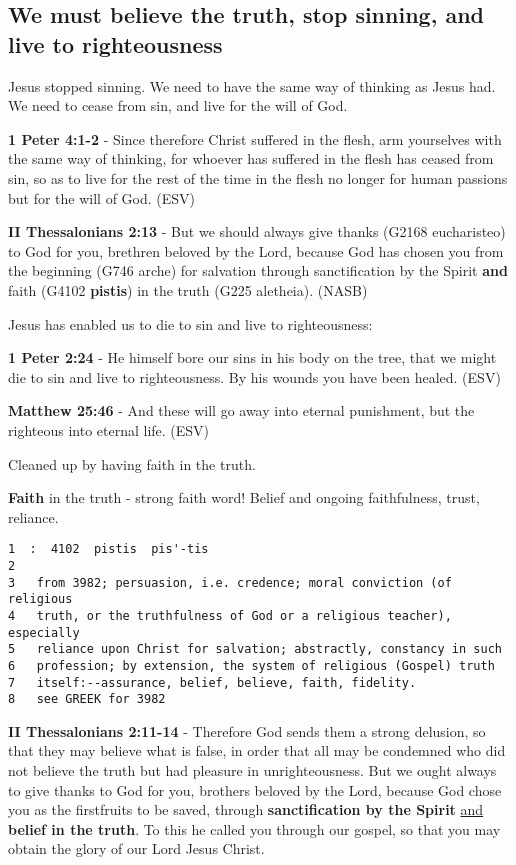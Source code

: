 \documentclass[11pt]{article}
\begin{document}
\subsection{We must believe the truth, stop sinning, and live to righteousness}
\label{sec:orgf050afa}
Jesus stopped sinning. We need to have the same way of thinking as Jesus had.
We need to cease from sin, and live for the will of God.

\textbf{1 Peter 4:1-2} - Since therefore Christ suffered in the flesh, arm yourselves with the same way of thinking, for whoever has suffered in the flesh has ceased from sin, so as to live for the rest of the time in the flesh no longer for human passions but for the will of God. (ESV)

\textbf{II Thessalonians 2:13} - But we should always give thanks (G2168 eucharisteo) to God for you, brethren beloved by the Lord, because God has chosen you from the beginning (G746 arche) for salvation through sanctification by the Spirit \textbf{and} faith (G4102 \textbf{pistis}) in the truth (G225 aletheia). (NASB)

Jesus has enabled us to die to sin and live to righteousness:

\textbf{1 Peter 2:24} - He himself bore our sins in his body on the tree, that we might die to sin and live to righteousness.  By his wounds you have been healed.  (ESV)

\textbf{Matthew 25:46} - And these will go away into eternal punishment, but the righteous into eternal life. (ESV)

Cleaned up by having faith in the truth.

\textbf{Faith} in the truth - strong faith word! Belief and ongoing faithfulness, trust, reliance.

\begin{verbatim}
1  :  4102  pistis  pis'-tis
2  
3   from 3982; persuasion, i.e. credence; moral conviction (of religious
4   truth, or the truthfulness of God or a religious teacher), especially
5   reliance upon Christ for salvation; abstractly, constancy in such
6   profession; by extension, the system of religious (Gospel) truth
7   itself:--assurance, belief, believe, faith, fidelity.
8   see GREEK for 3982
\end{verbatim}

\textbf{II Thessalonians 2:11-14} - Therefore God sends them a strong delusion, so that they may believe what is false, in order that all may be condemned who did not believe the truth but had pleasure in unrighteousness. But we ought always to give thanks to God for you, brothers beloved by the Lord, because God chose you as the firstfruits to be saved, through \textbf{sanctification by the Spirit} \uline{and} \textbf{belief in the truth}. To this he called you through our gospel, so that you may obtain the glory of our Lord Jesus Christ.
\end{document}
